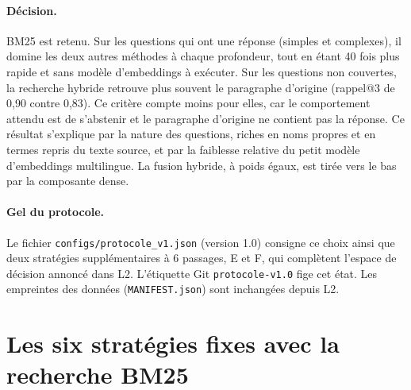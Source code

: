 \documentclass[11pt,a4paper]{article}
\begin{document}
\paragraph{Décision.} BM25 est retenu. Sur les questions qui ont une réponse (simples et complexes),
il domine les deux autres méthodes à chaque profondeur, tout en étant 40 fois plus rapide et sans
modèle d'embeddings à exécuter. Sur les questions non couvertes, la recherche hybride retrouve plus
souvent le paragraphe d'origine (rappel@3 de 0,90 contre 0,83). Ce critère compte moins pour elles, car
le comportement attendu est de s'abstenir et le paragraphe d'origine ne contient pas la réponse. Ce résultat s'explique par la
nature des questions, riches en noms propres et en termes repris du texte source, et par la faiblesse
relative du petit modèle d'embeddings multilingue. La fusion hybride, à poids égaux, est tirée vers le
bas par la composante dense.

\paragraph{Gel du protocole.} Le fichier \texttt{configs/protocole\_v1.json} (version 1.0) consigne ce
choix ainsi que deux stratégies supplémentaires à 6 passages, E et F, qui complètent l'espace de
décision annoncé dans L2. L'étiquette Git \texttt{protocole-v1.0} fige cet état. Les empreintes des
données (\texttt{MANIFEST.json}) sont inchangées depuis L2.

\section{Les six stratégies fixes avec la recherche BM25}\label{sec:strategies}
\end{document}

